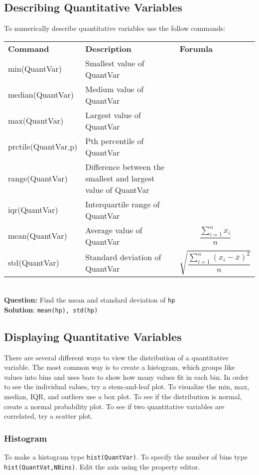 \documentclass[10pt]{article}
\begin{document}
\subsection{Describing Quantitative Variables}
To numerically describe quantitative variables use the follow commands:
\\
\begin{tabular}{p{100pt} p{170pt}  p{110pt} }
\textbf{Command} & \textbf{Description}&\textbf{Forumla}\\
min(QuantVar)&Smallest value of QuantVar&\\
median(QuantVar)&Medium value of QuantVar&\\
max(QuantVar)&Largest value of QuantVar&\\
prctile(QuantVar,p)&Pth percentile of QuantVar&\\
range(QuantVar)&Difference between the smallest and largest value of QuantVar&\\
iqr(QuantVar)&Interquartile range of QuantVar&\\
mean(QuantVar)&Average value of QuantVar&\[\frac{\sum_{i=1}^{n} x_i} {n}\]\\
std(QuantVar)&Standard deviation of QuantVar&\[\sqrt{\frac{\sum_{i=1}^{n} (x_i-\bar{x})^2} {n}}\]\\
\end{tabular} \\
\textbf{Question:}
Find the mean and standard deviation of \texttt{hp}
 \\\textbf{Solution}: 
 \texttt{mean(hp), std(hp)}
 \subsection{Displaying Quantitative Variables}
 There are several different ways to view the distribution of a quantitative variable. The most common way is to create a histogram, which groups like values into bins and uses bars to show how many values fit in each bin. In order to see the individual values, try a stem-and-leaf plot. To visualize the min, max, median, IQR, and outliers use a box plot. To see if the distribution is normal, create a normal probability plot. To see if two quantitative variables are correlated, try a scatter plot.
 \subsubsection{Histogram}
 To make a histogram type \texttt{hist(QuantVar)}. To specify the number of bins type \texttt{hist(QuantVat,NBins)}. Edit the axis using the property editor.
\end{document}
